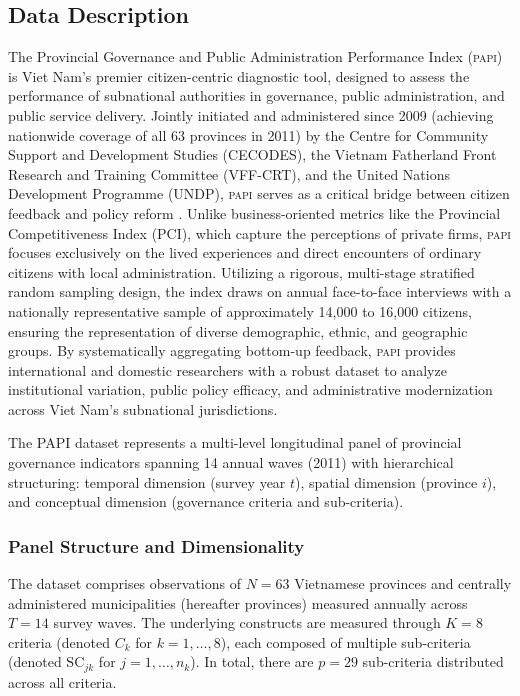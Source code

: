 \documentclass[12pt,a4paper]{article}
\newcommand{\PAPI}{\textsc{papi}\xspace}
\begin{document}
\subsection{Data Description}
\label{subsec:data}

The Provincial Governance and Public Administration Performance Index (\PAPI) is Viet Nam's premier citizen-centric diagnostic tool, designed to assess the performance of subnational authorities in governance, public administration, and public service delivery. Jointly initiated and administered since 2009 (achieving nationwide coverage of all 63 provinces in 2011) by the Centre for Community Support and Development Studies (CECODES), the Vietnam Fatherland Front Research and Training Committee (VFF-CRT), and the United Nations Development Programme (UNDP), \PAPI serves as a critical bridge between citizen feedback and policy reform \citep{PAPI2024}. Unlike business-oriented metrics like the Provincial Competitiveness Index (PCI), which capture the perceptions of private firms, \PAPI focuses exclusively on the lived experiences and direct encounters of ordinary citizens with local administration. Utilizing a rigorous, multi-stage stratified random sampling design, the index draws on annual face-to-face interviews with a nationally representative sample of approximately 14,000 to 16,000 citizens, ensuring the representation of diverse demographic, ethnic, and geographic groups. By systematically aggregating bottom-up feedback, \PAPI provides international and domestic researchers with a robust dataset to analyze institutional variation, public policy efficacy, and administrative modernization across Viet Nam's subnational jurisdictions.


The PAPI dataset represents a multi-level longitudinal panel of provincial governance indicators spanning 14 annual waves (2011) with hierarchical structuring: temporal dimension (survey year $t$), spatial dimension (province $i$), and conceptual dimension (governance criteria and sub-criteria).

\subsubsection{Panel Structure and Dimensionality}

The dataset comprises observations of $N = 63$ Vietnamese provinces and centrally administered municipalities (hereafter provinces) measured annually across $T = 14$ survey waves. The underlying constructs are measured through $K = 8$ criteria (denoted $C_k$ for $k = 1, \ldots, 8$), each composed of multiple sub-criteria (denoted $\text{SC}_{jk}$ for $j = 1, \ldots, n_k$). In total, there are $p = 29$ sub-criteria distributed across all criteria.
\end{document}
